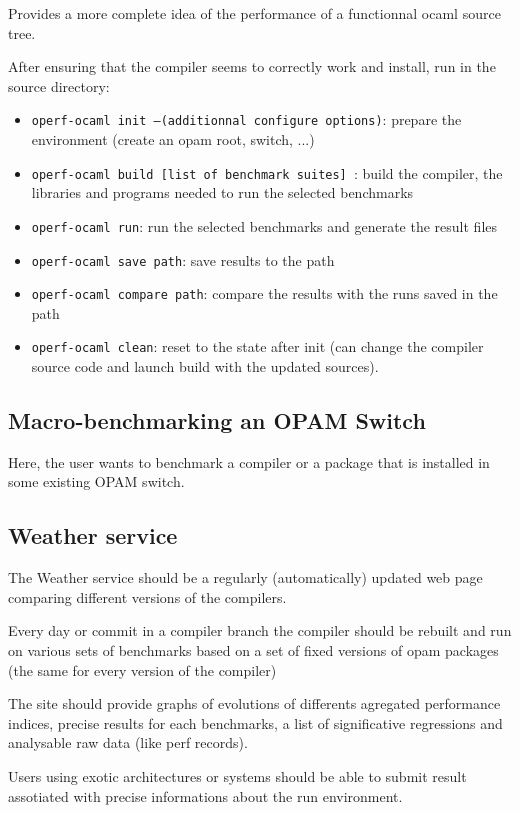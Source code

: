 \documentclass[11pt,a4paper]{article}
\begin{document}
Provides a more complete idea of the performance of a functionnal
ocaml source tree.

After ensuring that the compiler seems to correctly work and install,
run in the source directory:

\begin{itemize}
\item {\tt operf-ocaml init --(additionnal configure options)}: prepare the environment (create an opam root, switch, ...)
\item {\tt operf-ocaml build [list of benchmark suites] }: build the compiler, the libraries and programs needed to run the selected benchmarks
\item {\tt operf-ocaml run}: run the selected benchmarks and generate the result files
\item {\tt operf-ocaml save path}: save results to the path
\item {\tt operf-ocaml compare path}: compare the results with the runs saved in the path
\item {\tt operf-ocaml clean}: reset to the state after init (can change the compiler source code and launch build with the updated sources).
\end{itemize}

\subsection{Macro-benchmarking an OPAM Switch}

Here, the user wants to benchmark a compiler or a package that is
installed in some existing OPAM switch.

\subsection{Weather service}

The Weather service should be a regularly (automatically) updated web
page comparing different versions of the compilers.

Every day or commit in a compiler branch the compiler should be
rebuilt and run on various sets of benchmarks based on a set of fixed
versions of opam packages (the same for every version of the compiler)

The site should provide graphs of evolutions of differents agregated
performance indices, precise results for each benchmarks, a list of
significative regressions and analysable raw data (like perf records).

Users using exotic architectures or systems should be able to submit
result assotiated with precise informations about the run environment.
\end{document}
